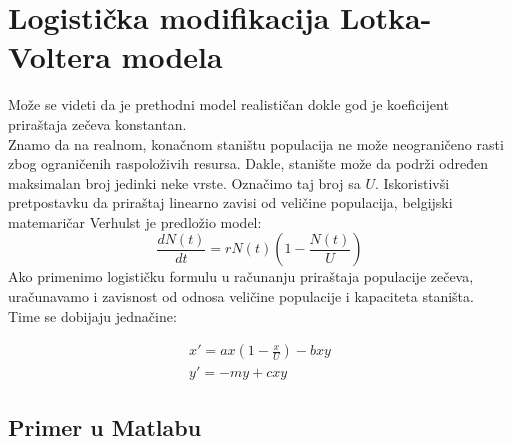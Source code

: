 \documentclass[a4paper]{article}
\begin{document}
\section{Logistička modifikacija Lotka-Voltera modela}
\label{sec:log_mod}
Može se videti da je prethodni model realističan dokle god je koeficijent priraštaja zečeva konstantan.\\
Znamo da na realnom, konačnom staništu populacija ne može neograničeno rasti zbog
ograničenih raspoloživih resursa. Dakle, stanište može da podrži određen maksimalan broj
jedinki neke vrste. Označimo taj broj sa $U$. Iskoristivši pretpostavku
da priraštaj linearno zavisi od veličine populacija, belgijski matemaričar Verhulst je predložio model:
	\begin{equation}
		\frac{dN(t)}{dt}=rN (t) (1 - \frac{N (t)}{U})
	\end{equation}
Ako primenimo logističku formulu u računanju priraštaja populacije zečeva, uračunavamo i zavisnost
od odnosa veličine populacije i kapaciteta staništa.\\
Time se dobijaju jednačine:

    \begin{equation}
        \label{eq:log_mod}
        \begin{aligned}
            x' = ax(1 - \frac{x}{U}) - bxy\\
            y' = -my + cxy
        \end{aligned}
	\end{equation}

\pagebreak

\subsection{Primer u Matlabu}
\label{sub:log_mod_matlab}


\end{document}
